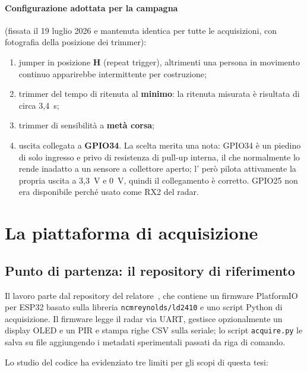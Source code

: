 \paragraph{Configurazione adottata per la campagna} (fissata il 19 luglio 2026 e
mantenuta identica per tutte le acquisizioni, con fotografia della posizione dei
trimmer):

\begin{enumerate}[leftmargin=1.8em,itemsep=2pt]
  \item jumper in posizione \textbf{H} (repeat trigger), altrimenti una persona in
        movimento continuo apparirebbe intermittente per costruzione;
  \item trimmer del tempo di ritenuta al \textbf{minimo}: la ritenuta misurata è
        risultata di circa 3,4~s;
  \item trimmer di sensibilità a \textbf{metà corsa};
  \item uscita collegata a \textbf{GPIO34}. La scelta merita una nota: GPIO34 è un
        piedino di solo ingresso e privo di resistenza di pull-up interna, il che
        normalmente lo rende inadatto a un sensore a collettore aperto;
        l'\pir{} però pilota attivamente la propria uscita a 3,3~V e 0~V, quindi il
        collegamento è corretto. GPIO25 non era disponibile perché usato come RX2
        del radar.
\end{enumerate}

\section{La piattaforma di acquisizione}
\label{sec:piattaforma}

\subsection{Punto di partenza: il repository di riferimento}

Il lavoro parte dal repository del relatore~\cite{repoCallisto}, che contiene un
firmware PlatformIO per ESP32 basato sulla libreria \texttt{ncmreynolds/ld2410} e
uno script Python di acquisizione. Il firmware legge il radar via UART, gestisce
opzionalmente un display OLED e un PIR e stampa righe CSV sulla seriale; lo script
\texttt{acquire.py} le salva su file aggiungendo i metadati sperimentali passati
da riga di comando.

Lo studio del codice ha evidenziato tre limiti per gli scopi di questa tesi:

